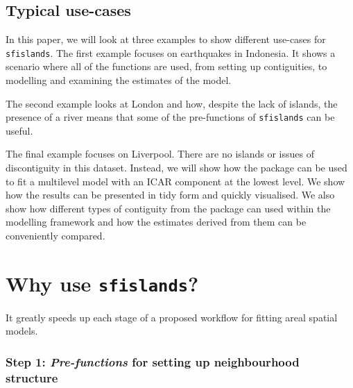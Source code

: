 \hypertarget{typical-use-cases}{%
\subsection{Typical use-cases}\label{typical-use-cases}}

In this paper, we will look at three examples to show different use-cases for
\texttt{sfislands}. The first example focuses on earthquakes in
Indonesia. It shows a scenario where all of the functions are used, from
setting up contiguities, to modelling and examining the estimates of the
model.

The second example looks at London and how, despite the lack of islands,
the presence of a river means that some of the pre-functions of
\texttt{sfislands} can be useful.

The final example focuses on Liverpool. There are no islands or issues
of discontiguity in this dataset. Instead, we will show how the package
can be used to fit a multilevel model with an ICAR component at the lowest
level. We show how the results can be presented in tidy form and quickly
visualised. We also show how different types of contiguity from the
 package can used within the  modelling
framework and how the estimates derived from them can be conveniently
compared.

\hypertarget{why-use-sfislands}{%
\section{\texorpdfstring{Why use \texttt{sfislands}?}{Why use sfislands?}}\label{why-use-sfislands}}

It greatly speeds up each stage of a proposed workflow for fitting areal spatial models.

\hypertarget{step-1-pre-functions-for-setting-up-neighbourhood-structure}{%
\subsubsection{\texorpdfstring{Step 1: \emph{Pre-functions} for setting up neighbourhood structure}{Step 1: Pre-functions for setting up neighbourhood structure}}\label{step-1-pre-functions-for-setting-up-neighbourhood-structure}}


